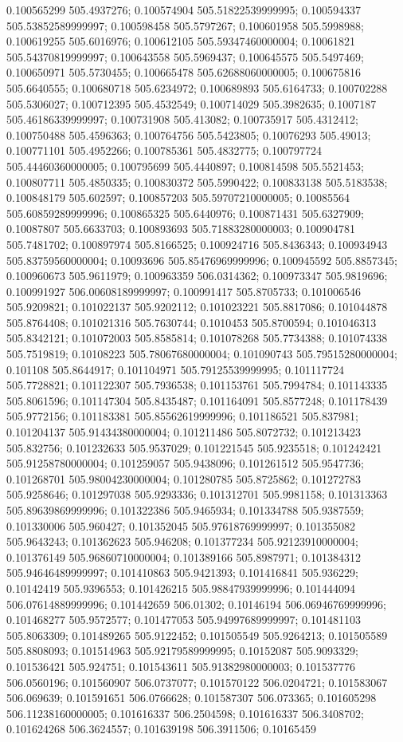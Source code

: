 0.100565299 505.4937276; 0.100574904 505.51822539999995; 0.100594337 505.53852589999997; 0.100598458 505.5797267; 0.100601958 505.5998988; 0.100619255 505.6016976; 0.100612105 505.59347460000004; 0.10061821 505.54370819999997; 0.100643558 505.5969437; 0.100645575 505.5497469; 0.100650971 505.5730455; 0.100665478 505.62688060000005; 0.100675816 505.6640555; 0.100680718 505.6234972; 0.100689893 505.6164733; 0.100702288 505.5306027; 0.100712395 505.4532549; 0.100714029 505.3982635; 0.1007187 505.46186339999997; 0.100731908 505.413082; 0.100735917 505.4312412; 0.100750488 505.4596363; 0.100764756 505.5423805; 0.10076293 505.49013; 0.100771101 505.4952266; 0.100785361 505.4832775; 0.100797724 505.44460360000005; 0.100795699 505.4440897; 0.100814598 505.5521453; 0.100807711 505.4850335; 0.100830372 505.5990422; 0.100833138 505.5183538; 0.100848179 505.602597; 0.100857203 505.59707210000005; 0.10085564 505.60859289999996; 0.100865325 505.6440976; 0.100871431 505.6327909; 0.10087807 505.6633703; 0.100893693 505.71883280000003; 0.100904781 505.7481702; 0.100897974 505.8166525; 0.100924716 505.8436343; 0.100934943 505.83759560000004; 0.10093696 505.85476969999996; 0.100945592 505.8857345; 0.100960673 505.9611979; 0.100963359 506.0314362; 0.100973347 505.9819696; 0.100991927 506.00608189999997; 0.100991417 505.8705733; 0.101006546 505.9209821; 0.101022137 505.9202112; 0.101023221 505.8817086; 0.101044878 505.8764408; 0.101021316 505.7630744; 0.1010453 505.8700594; 0.101046313 505.8342121; 0.101072003 505.8585814; 0.101078268 505.7734388; 0.101074338 505.7519819; 0.10108223 505.78067680000004; 0.101090743 505.79515280000004; 0.101108 505.8644917; 0.101104971 505.79125539999995; 0.101117724 505.7728821; 0.101122307 505.7936538; 0.101153761 505.7994784; 0.101143335 505.8061596; 0.101147304 505.8435487; 0.101164091 505.8577248; 0.101178439 505.9772156; 0.101183381 505.85562619999996; 0.101186521 505.837981; 0.101204137 505.91434380000004; 0.101211486 505.8072732; 0.101213423 505.832756; 0.101232633 505.9537029; 0.101221545 505.9235518; 0.101242421 505.91258780000004; 0.101259057 505.9438096; 0.101261512 505.9547736; 0.101268701 505.98004230000004; 0.101280785 505.8725862; 0.101272783 505.9258646; 0.101297038 505.9293336; 0.101312701 505.9981158; 0.101313363 505.89639869999996; 0.101322386 505.9465934; 0.101334788 505.9387559; 0.101330006 505.960427; 0.101352045 505.97618769999997; 0.101355082 505.9643243; 0.101362623 505.946208; 0.101377234 505.92123910000004; 0.101376149 505.96860710000004; 0.101389166 505.8987971; 0.101384312 505.94646489999997; 0.101410863 505.9421393; 0.101416841 505.936229; 0.10142419 505.9396553; 0.101426215 505.98847939999996; 0.101444094 506.07614889999996; 0.101442659 506.01302; 0.10146194 506.06946769999996; 0.101468277 505.9572577; 0.101477053 505.94997689999997; 0.101481103 505.8063309; 0.101489265 505.9122452; 0.101505549 505.9264213; 0.101505589 505.8808093; 0.101514963 505.92179589999995; 0.10152087 505.9093329; 0.101536421 505.924751; 0.101543611 505.91382980000003; 0.101537776 506.0560196; 0.101560907 506.0737077; 0.101570122 506.0204721; 0.101583067 506.069639; 0.101591651 506.0766628; 0.101587307 506.073365; 0.101605298 506.11238160000005; 0.101616337 506.2504598; 0.101616337 506.3408702; 0.101624268 506.3624557; 0.101639198 506.3911506; 0.10165459 